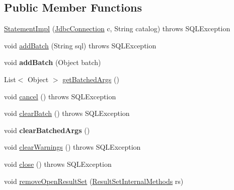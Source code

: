 \subsection*{Public Member Functions}
\begin{DoxyCompactItemize}
\item 
\mbox{\hyperlink{classcom_1_1mysql_1_1cj_1_1jdbc_1_1_statement_impl_ab7415feadb30fb623edffd1b9bd40d5d}{Statement\+Impl}} (\mbox{\hyperlink{interfacecom_1_1mysql_1_1cj_1_1jdbc_1_1_jdbc_connection}{Jdbc\+Connection}} c, String catalog)  throws S\+Q\+L\+Exception 
\item 
void \mbox{\hyperlink{classcom_1_1mysql_1_1cj_1_1jdbc_1_1_statement_impl_aea9552692a06b93f8f8ed477c5d879c4}{add\+Batch}} (String sql)  throws S\+Q\+L\+Exception 
\item 
\mbox{\label{classcom_1_1mysql_1_1cj_1_1jdbc_1_1_statement_impl_a9fff3c6369792a80971d749bc3d2303a}} 
void {\bfseries add\+Batch} (Object batch)
\item 
List$<$ Object $>$ \mbox{\hyperlink{classcom_1_1mysql_1_1cj_1_1jdbc_1_1_statement_impl_a19609eb768e13632f7a8eb0fd14cdfd5}{get\+Batched\+Args}} ()
\item 
void \mbox{\hyperlink{classcom_1_1mysql_1_1cj_1_1jdbc_1_1_statement_impl_a89d3ae6ba7d634b3a5aa0b9014b2cf80}{cancel}} ()  throws S\+Q\+L\+Exception 
\item 
void \mbox{\hyperlink{classcom_1_1mysql_1_1cj_1_1jdbc_1_1_statement_impl_a6730720b7a5409cab4d4c537b514f7c8}{clear\+Batch}} ()  throws S\+Q\+L\+Exception 
\item 
\mbox{\label{classcom_1_1mysql_1_1cj_1_1jdbc_1_1_statement_impl_a42618e455d715cde9a92efbc6922b252}} 
void {\bfseries clear\+Batched\+Args} ()
\item 
void \mbox{\hyperlink{classcom_1_1mysql_1_1cj_1_1jdbc_1_1_statement_impl_a7356ed117aa4417ec6ce92292f53470b}{clear\+Warnings}} ()  throws S\+Q\+L\+Exception 
\item 
void \mbox{\hyperlink{classcom_1_1mysql_1_1cj_1_1jdbc_1_1_statement_impl_ac913294cd1adc42af73229a6ba2e4f0b}{close}} ()  throws S\+Q\+L\+Exception 
\item 
void \mbox{\hyperlink{classcom_1_1mysql_1_1cj_1_1jdbc_1_1_statement_impl_aaf649eaefb9458d2857697f50ba46245}{remove\+Open\+Result\+Set}} (\mbox{\hyperlink{interfacecom_1_1mysql_1_1cj_1_1jdbc_1_1result_1_1_result_set_internal_methods}{Result\+Set\+Internal\+Methods}} rs)

\end{DoxyCompactItemize}
